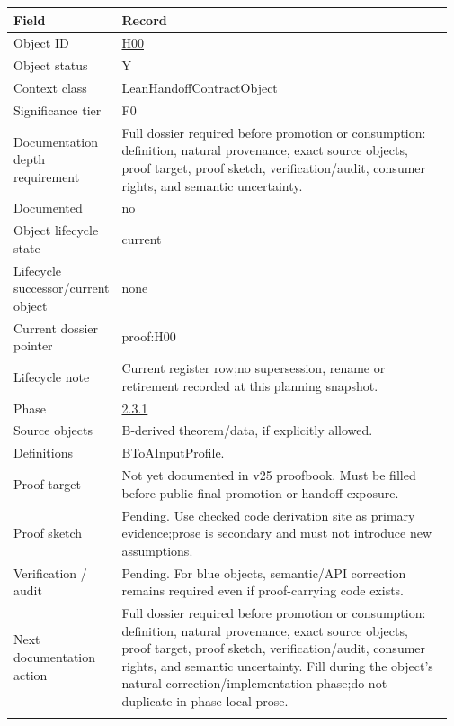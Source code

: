 \begin{longtable}{L{0.16\linewidth} L{0.81\linewidth}}
\hline
\textbf{Field} & \textbf{Record}\\
\hline
Object ID & \hyperlink{object-row-H00}{H00}\\
\hline\addlinespace[0.20em]
Object status & Y\\
\hline\addlinespace[0.20em]
Context class & LeanHandoffContractObject\\
\hline\addlinespace[0.20em]
Significance tier & F0\\
\hline\addlinespace[0.20em]
Documentation depth requirement & Full dossier required before promotion or consumption: definition, natural provenance, exact source objects, proof target, proof sketch, verification/\allowbreak{}audit, consumer rights, and semantic uncertainty.\\
\hline\addlinespace[0.20em]
Documented & no\\
\hline\addlinespace[0.20em]
Object lifecycle state & current\\
\hline\addlinespace[0.20em]
Lifecycle successor/\allowbreak{}current object & none\\
\hline\addlinespace[0.20em]
Current dossier pointer & proof:H00\\
\hline\addlinespace[0.20em]
Lifecycle note & Current register row;\newline no supersession, rename or retirement recorded at this planning snapshot.\\
\hline\addlinespace[0.20em]
Phase & \hyperlink{phase-row-2-3-1}{2.3.1}\\
\hline\addlinespace[0.20em]
Source objects & B-derived theorem/\allowbreak{}data, if explicitly allowed.\\
\hline\addlinespace[0.20em]
Definitions & BToAInputProfile.\\
\hline\addlinespace[0.20em]
Proof target & Not yet documented in v25 proofbook. Must be filled before public-final promotion or handoff exposure.\\
\hline\addlinespace[0.20em]
Proof sketch & Pending. Use checked code derivation site as primary evidence;\newline prose is secondary and must not introduce new assumptions.\\
\hline\addlinespace[0.20em]
Verification /\allowbreak{} audit & Pending. For blue objects, semantic/\allowbreak{}API correction remains required even if proof-carrying code exists.\\
\hline\addlinespace[0.20em]
Next documentation action & Full dossier required before promotion or consumption: definition, natural provenance, exact source objects, proof target, proof sketch, verification/\allowbreak{}audit, consumer rights, and semantic uncertainty. Fill during the object's natural correction/\allowbreak{}implementation phase;\newline do not duplicate in phase-local prose.\\
\hline\addlinespace[0.20em]
\end{longtable}
